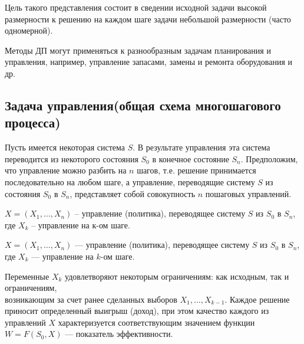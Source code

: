 \documentclass[17pt]{extarticle}
\begin{document}
Цель такого представления состоит в сведении
исходной задачи высокой размерности к решению
на каждом шаге задачи небольшой размерности
(часто одномерной).

Методы ДП могут применяться к разнообразным
задачам планирования и управления, например,
управление запасами, замены и ремонта
оборудования и др.

\subsection{Задача управления(общая схема многошагового процесса)}
Пусть имеется некоторая система $S$.
В результате управления эта система переводится из некоторого состояния $S_0$ в конечное состояние $S_n$.
Предположим, что управление можно разбить на $n$ шагов, т.е. решение принимается последовательно на любом шаге,
а управление, переводящие систему $S$ из состояния $S_0$ в $S_n$, представляет собой совокупность $n$ пошаговых управлений.


$X=(X_1, \dots, X_n)$ -- управление (политика), переводящее систему $S$ из $S_0$ в $S_n$, где $X_k$ -- управление на к-ом шаге.

\( X = (X_{1}, \ldots, X_{n}) \) — управление (политика), переводящее систему \( S \) из \( S_0 \) в \( S_n \), где
\( X_k \) — управление на \( k \)-ом шаге.

Переменные \( X_k \) удовлетворяют некоторым ограничениям: как исходным, так и ограничениям, \\
возникающим за счет ранее сделанных выборов
\( X_{1}, \ldots, X_{k-1} \).
Каждое решение приносит определенный выигрыш (доход),
при этом качество каждого из управлений \( X \) характеризуется
соответствующим значением функции \( W = F(S_0, X) \) — показатель эффективности.
\end{document}
